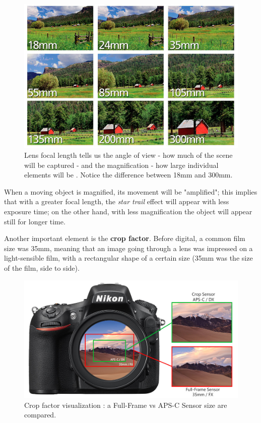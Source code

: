\documentclass[]{article}
\begin{document}
\begin{figure}[H]
	\centering
	\includegraphics[width=0.7\linewidth]{images/background/focallength}
	\caption{Lens focal length tells us the angle of view - how much of the scene will be captured - and the magnification - how large individual elements will be \cite{nikon}. Notice the difference between 18mm and 300mm.\\}
\end{figure}

When a moving object is magnified, its movement will be "amplified"; this implies that with a greater focal length, the \textit{star trail} effect will appear with less exposure time; on the other hand, with less magnification the object will appear still for longer time. 

Another important element is the \textbf{crop factor}. Before digital, a common film size was 35mm, meaning that an image going through a lens was impressed on a light-sensible film, with a rectangular shape of a certain size (35mm was the size of the film, side to side).

\begin{figure}[H]
	\centering
	\includegraphics[width=0.7\linewidth]{images/background/crop_factor.jpg}
	\caption{Crop factor visualization \cite{cropfactor}: a Full-Frame vs APS-C Sensor size are compared.\\}
\end{figure}
\end{document}
